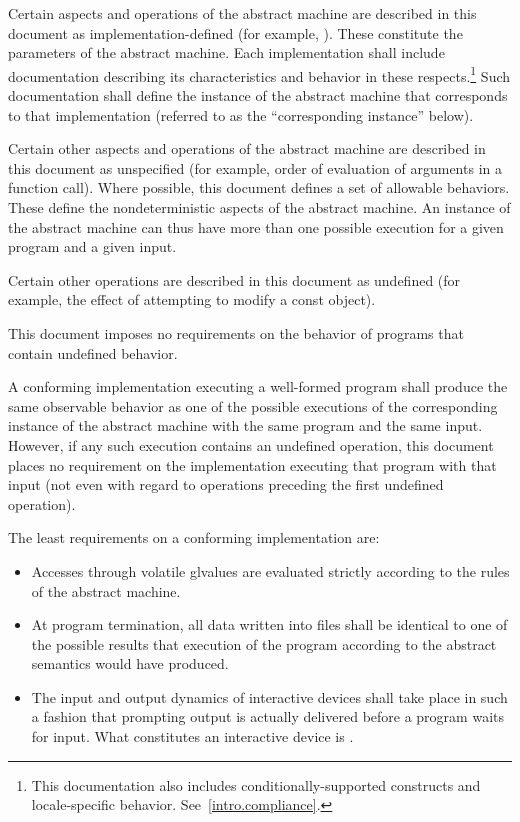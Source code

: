 \pnum
{}%
Certain aspects and operations of the abstract machine are described in this
document as implementation-defined (for example,
). These constitute the parameters of the abstract machine.
Each implementation shall include documentation describing its characteristics
and behavior in these respects.\footnote{This documentation also includes
conditionally-supported constructs and locale-specific behavior.
See~\ref{intro.compliance}.} Such documentation shall define the instance of the
abstract machine that corresponds to that implementation (referred to as the
``corresponding instance'' below).

\pnum
{}%
Certain other aspects and operations of the abstract machine are
described in this document as unspecified (for example,
order of evaluation of arguments in a function call).
Where possible, this
document defines a set of allowable behaviors. These
define the nondeterministic aspects of the abstract machine. An instance
of the abstract machine can thus have more than one possible execution
for a given program and a given input.

\pnum
{}%
Certain other operations are described in this document as
undefined (for example, the effect of
attempting to modify a const object).
\begin{note}
This document imposes no requirements on the
behavior of programs that contain undefined behavior.
\end{note}

\pnum
{}%
%
A conforming implementation executing a well-formed program shall
produce the same observable behavior as one of the possible executions
of the corresponding instance of the abstract machine with the
same program and the same input.
%
However, if any such execution contains an undefined operation, this document places no
requirement on the implementation executing that program with that input
(not even with regard to operations preceding the first undefined
operation).

\pnum
{}%
The least requirements on a conforming implementation are:
\begin{itemize}
\item
Accesses through volatile glvalues are evaluated strictly according to the
rules of the abstract machine.
\item
At program termination, all data written into files shall be
identical to one of the possible results that execution of the program
according to the abstract semantics would have produced.
\item
The input and output dynamics of interactive devices shall take
place in such a fashion that prompting output is actually delivered before a program waits for input. What constitutes an interactive device is
.
\end{itemize}

